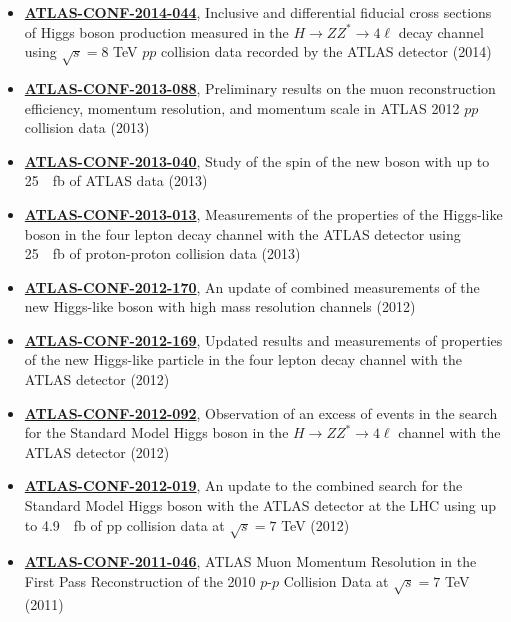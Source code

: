 \begin{cvinterests}
{\begin{itemize}[labelwidth=0.05in,align=right,leftmargin=!,labelsep=0pt,
itemsep=0.0em]
final states (2015)
%
\item[] \href{https://atlas.web.cern.ch/Atlas/GROUPS/PHYSICS/CONFNOTES/ATLAS-CONF-2014-044/}{\textbf{ATLAS-CONF-2014-044}},
Inclusive and differential fiducial cross sections of Higgs boson production
measured in the $H\to ZZ^{*}\to 4\ell$ decay channel using $\sqrt{s}=8$
\si{\tera\electronvolt} $pp$ collision data recorded by the ATLAS detector
(2014)
%
\item[] \href{https://cds.cern.ch/record/1580207}{\textbf{ATLAS-CONF-2013-088}},
Preliminary results on the muon reconstruction efficiency, momentum resolution,
and momentum scale in ATLAS 2012 $pp$ collision data (2013)
%
\item[] \href{https://atlas.web.cern.ch/Atlas/GROUPS/PHYSICS/CONFNOTES/ATLAS-CONF-2013-040/}{\textbf{ATLAS-CONF-2013-040}},
Study of the spin of the new boson with up to \SI{25}{\per\femto\barn} of ATLAS
data (2013)
%
\item[] \href{https://atlas.web.cern.ch/Atlas/GROUPS/PHYSICS/CONFNOTES/ATLAS-CONF-2013-013/}{\textbf{ATLAS-CONF-2013-013}},
Measurements of the properties of the Higgs-like boson in the four lepton decay
channel with the ATLAS detector using \SI{25}{\per\femto\barn} of proton-proton
collision data (2013)
%
\item[] \href{https://atlas.web.cern.ch/Atlas/GROUPS/PHYSICS/CONFNOTES/ATLAS-CONF-2012-170/}{\textbf{ATLAS-CONF-2012-170}},
An update of combined measurements of the new Higgs-like boson with high mass
resolution channels (2012)
%
\item[] \href{https://atlas.web.cern.ch/Atlas/GROUPS/PHYSICS/CONFNOTES/ATLAS-CONF-2012-169/}{\textbf{ATLAS-CONF-2012-169}},
Updated results and measurements of properties of the new Higgs-like particle
in the four lepton decay channel with the ATLAS detector (2012)
%
\item[] \href{https://atlas.web.cern.ch/Atlas/GROUPS/PHYSICS/CONFNOTES/ATLAS-CONF-2012-092/}{\textbf{ATLAS-CONF-2012-092}},
Observation of an excess of events in the search for the Standard Model Higgs
boson in the $H\to ZZ^{*}\to 4\ell$ channel with the ATLAS detector (2012)
%
\item[] \href{https://atlas.web.cern.ch/Atlas/GROUPS/PHYSICS/CONFNOTES/ATLAS-CONF-2012-019/}{\textbf{ATLAS-CONF-2012-019}},
An update to the combined search for the Standard Model Higgs boson with the
ATLAS detector at the LHC using up to \SI{4.9}{\per\femto\barn} of pp collision
data at $\sqrt{s}=7$ \si{\tera\electronvolt} (2012)
%
\item[] \href{https://atlas.web.cern.ch/Atlas/GROUPS/PHYSICS/CONFNOTES/ATLAS-CONF-2011-046/}{\textbf{ATLAS-CONF-2011-046}},
ATLAS Muon Momentum Resolution in the First Pass Reconstruction of the 2010
$p$-$p$ Collision Data at $\sqrt{s}=7$ \si{\tera\electronvolt} (2011)
%
\end{itemize}
}
\end{cvinterests}

